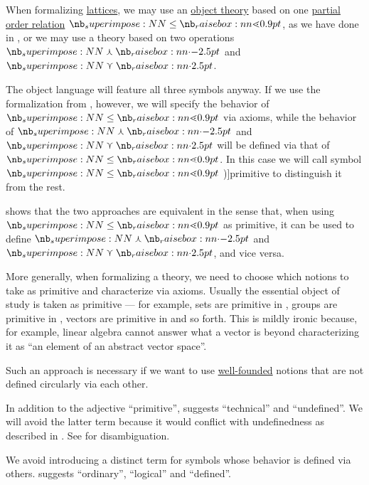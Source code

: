 \begin{concept}\label{con:primitive_notion}
  When formalizing \hyperref[def:lattice]{lattices}, we may use an \hyperref[con:metalogic]{object theory} based on one \hyperref[def:partially_ordered_set]{partial order relation} \( {\synleq} \), as we have done in , or we may use a theory based on two operations \( {\synvarwedge} \) and \( {\synvarvee} \).

  The object language will feature all three symbols anyway. If we use the formalization from , however, we will specify the behavior of \( {\synleq} \) via axioms, while the behavior of \( {\synvarwedge} \) and \( {\synvarvee} \) will be defined via that of \( {\synleq} \). In this case we will call symbol \( {\synleq} \) \term[en=primitive (\cite[28]{Kleene1971Metamathematics})]{primitive} to distinguish it from the rest.

   shows that the two approaches are equivalent in the sense that, when using \( {\synleq} \) as primitive, it can be used to define \( {\synvarwedge} \) and \( {\synvarvee} \), and vice versa.

  More generally, when formalizing a theory, we need to choose which notions to take as primitive and characterize via axioms. Usually the essential object of study is taken as primitive --- for example, sets are primitive in , groups are primitive in , vectors are primitive in  and so forth. This is mildly ironic because, for example, linear algebra cannot answer what a vector is beyond characterizing it as \enquote{an element of an abstract vector space}.

  Such an approach is necessary if we want to use \hyperref[def:well_founded_relation]{well-founded} notions that are not defined circularly via each other.
\end{concept}
\begin{comments}
  \item In addition to the adjective \enquote{primitive},  suggests \enquote{technical} and \enquote{undefined}. We will avoid the latter term because it would conflict with undefinedness as described in . See  for disambiguation.

  \item We avoid introducing a distinct term for symbols whose behavior is defined via others.  suggests \enquote{ordinary}, \enquote{logical} and \enquote{defined}.
\end{comments}

